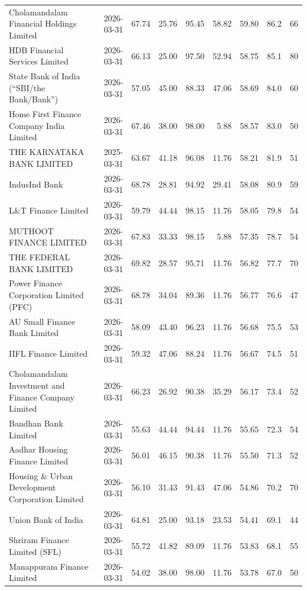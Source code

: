 {\begin{longtable}{@{}L{5.1cm}rrrrrrrr@{}}
Cholamandalam Financial Holdings Limited & 2026-03-31 & 67.74 & 25.76 & 95.45 & 58.82 & 59.80 & 86.2 & 66 \\
HDB Financial Services Limited & 2026-03-31 & 66.13 & 25.00 & 97.50 & 52.94 & 58.75 & 85.1 & 80 \\
State Bank of India (“SBI/the Bank/Bank”) & 2026-03-31 & 57.05 & 45.00 & 88.33 & 47.06 & 58.69 & 84.0 & 60 \\
Home First Finance Company India Limited & 2026-03-31 & 67.46 & 38.00 & 98.00 & 5.88 & 58.57 & 83.0 & 50 \\
THE KARNATAKA BANK LIMITED & 2025-03-31 & 63.67 & 41.18 & 96.08 & 11.76 & 58.21 & 81.9 & 51 \\
IndusInd Bank & 2026-03-31 & 68.78 & 28.81 & 94.92 & 29.41 & 58.08 & 80.9 & 59 \\
L\&T Finance Limited & 2026-03-31 & 59.79 & 44.44 & 98.15 & 11.76 & 58.05 & 79.8 & 54 \\
MUTHOOT FINANCE LIMITED & 2026-03-31 & 67.83 & 33.33 & 98.15 & 5.88 & 57.35 & 78.7 & 54 \\
THE FEDERAL BANK LIMITED & 2026-03-31 & 69.82 & 28.57 & 95.71 & 11.76 & 56.82 & 77.7 & 70 \\
Power Finance Corporation Limited (PFC) & 2026-03-31 & 68.78 & 34.04 & 89.36 & 11.76 & 56.77 & 76.6 & 47 \\
AU Small Finance Bank Limited & 2026-03-31 & 58.09 & 43.40 & 96.23 & 11.76 & 56.68 & 75.5 & 53 \\
IIFL Finance Limited & 2026-03-31 & 59.32 & 47.06 & 88.24 & 11.76 & 56.67 & 74.5 & 51 \\
Cholamandalam Investment and Finance Company Limited & 2026-03-31 & 66.23 & 26.92 & 90.38 & 35.29 & 56.17 & 73.4 & 52 \\
Bandhan Bank Limited & 2026-03-31 & 55.63 & 44.44 & 94.44 & 11.76 & 55.65 & 72.3 & 54 \\
Aadhar Housing Finance Limited & 2026-03-31 & 56.01 & 46.15 & 90.38 & 11.76 & 55.50 & 71.3 & 52 \\
Housing \& Urban Development Corporation Limited & 2026-03-31 & 56.10 & 31.43 & 91.43 & 47.06 & 54.86 & 70.2 & 70 \\
Union Bank of India & 2026-03-31 & 64.81 & 25.00 & 93.18 & 23.53 & 54.41 & 69.1 & 44 \\
Shriram Finance Limited (SFL) & 2026-03-31 & 55.72 & 41.82 & 89.09 & 11.76 & 53.83 & 68.1 & 55 \\
Manappuram Finance Limited & 2026-03-31 & 54.02 & 38.00 & 98.00 & 11.76 & 53.78 & 67.0 & 50 \\

\end{longtable}}
